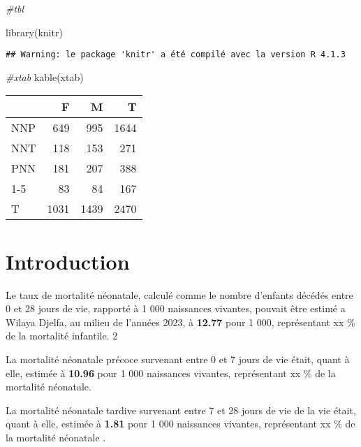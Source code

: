 \documentclass[
]{book}
\newenvironment{Shaded}{\begin{snugshade}}{\end{snugshade}}
\newcommand{\CommentTok}[1]{\textcolor[rgb]{0.56,0.35,0.01}{\textit{#1}}}
\newcommand{\FunctionTok}[1]{\textcolor[rgb]{0.00,0.00,0.00}{#1}}
\newcommand{\NormalTok}[1]{#1}
\begin{document}
\begin{Shaded}
\begin{Highlighting}[]
\CommentTok{\#tbl}
\end{Highlighting}
\end{Shaded}

\begin{Shaded}
\begin{Highlighting}[]
\FunctionTok{library}\NormalTok{(knitr)}
\end{Highlighting}
\end{Shaded}

\begin{verbatim}
## Warning: le package 'knitr' a été compilé avec la version R 4.1.3
\end{verbatim}

\begin{Shaded}
\begin{Highlighting}[]
\CommentTok{\#xtab}
\FunctionTok{kable}\NormalTok{(xtab)}
\end{Highlighting}
\end{Shaded}

\begin{tabular}{l|r|r|r}
\hline
  & F & M & T\\
\hline
NNP & 649 & 995 & 1644\\
\hline
NNT & 118 & 153 & 271\\
\hline
PNN & 181 & 207 & 388\\
\hline
1-5 & 83 & 84 & 167\\
\hline
T & 1031 & 1439 & 2470\\
\hline
\end{tabular}

\hypertarget{introduction}{%
\chapter{Introduction}\label{introduction}}

Le taux de mortalité néonatale, calculé comme le nombre d'enfants
décédés entre 0 et 28 jours de vie, rapporté à 1 000 naissances
vivantes, pouvait être estimé a Wilaya Djelfa, au milieu de l'années
2023, à \textbf{12.77} pour 1 000, représentant xx \% de la mortalité
infantile. 2

La mortalité néonatale précoce survenant entre 0 et 7 jours de vie
était, quant à elle, estimée à \textbf{10.96} pour 1 000 naissances
vivantes, représentant xx \% de la mortalité néonatale.

La mortalité néonatale tardive survenant entre 7 et 28 jours de vie de
la vie était, quant à elle, estimée à \textbf{1.81} pour 1 000
naissances vivantes, représentant xx \% de la mortalité néonatale .
\end{document}
